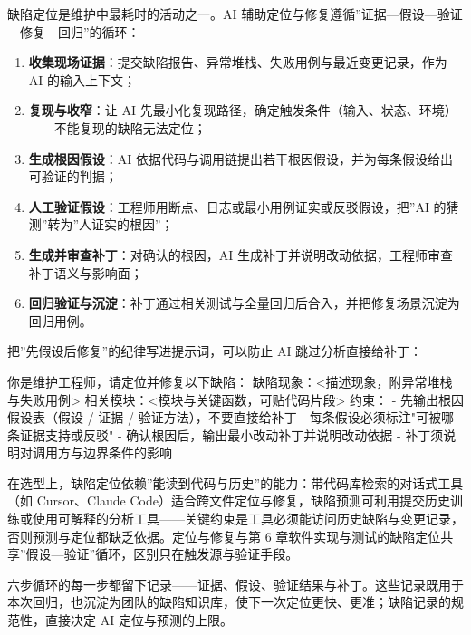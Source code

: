 \documentclass[
]{ctexbook}
\providecommand{\tightlist}{\setlength{\itemsep}{0pt}\setlength{\parskip}{0pt} }
\newenvironment{Shaded}{
  \ttfamily\small
}{}
\newcommand{\NormalTok}[1]{#1}
\begin{document}
缺陷定位是维护中最耗时的活动之一。AI
辅助定位与修复遵循''证据---假设---验证---修复---回归''的循环：

\begin{enumerate}
\def\labelenumi{\arabic{enumi}.}
\tightlist
\item
  \textbf{收集现场证据}：提交缺陷报告、异常堆栈、失败用例与最近变更记录，作为
  AI 的输入上下文；
\item
  \textbf{复现与收窄}：让 AI
  先最小化复现路径，确定触发条件（输入、状态、环境）------不能复现的缺陷无法定位；
\item
  \textbf{生成根因假设}：AI
  依据代码与调用链提出若干根因假设，并为每条假设给出可验证的判据；
\item
  \textbf{人工验证假设}：工程师用断点、日志或最小用例证实或反驳假设，把''AI
  的猜测''转为''人证实的根因''；
\item
  \textbf{生成并审查补丁}：对确认的根因，AI
  生成补丁并说明改动依据，工程师审查补丁语义与影响面；
\item
  \textbf{回归验证与沉淀}：补丁通过相关测试与全量回归后合入，并把修复场景沉淀为回归用例。
\end{enumerate}

把''先假设后修复''的纪律写进提示词，可以防止 AI 跳过分析直接给补丁：

\begin{Shaded}
\begin{Highlighting}[]
\NormalTok{你是维护工程师，请定位并修复以下缺陷：}
\NormalTok{缺陷现象：\textless{}描述现象，附异常堆栈与失败用例\textgreater{}}
\NormalTok{相关模块：\textless{}模块与关键函数，可贴代码片段\textgreater{}}
\NormalTok{约束：}
\NormalTok{{-} 先输出根因假设表（假设 / 证据 / 验证方法），不要直接给补丁}
\NormalTok{{-} 每条假设必须标注"可被哪条证据支持或反驳"}
\NormalTok{{-} 确认根因后，输出最小改动补丁并说明改动依据}
\NormalTok{{-} 补丁须说明对调用方与边界条件的影响}
\end{Highlighting}
\end{Shaded}

在选型上，缺陷定位依赖''能读到代码与历史''的能力：带代码库检索的对话式工具（如
Cursor、Claude
Code）适合跨文件定位与修复，缺陷预测可利用提交历史训练或使用可解释的分析工具------关键约束是工具必须能访问历史缺陷与变更记录，否则预测与定位都缺乏依据。定位与修复与第
6
章软件实现与测试的缺陷定位共享''假设---验证''循环，区别只在触发源与验证手段。

六步循环的每一步都留下记录------证据、假设、验证结果与补丁。这些记录既用于本次回归，也沉淀为团队的缺陷知识库，使下一次定位更快、更准；缺陷记录的规范性，直接决定
AI 定位与预测的上限。
\end{document}
